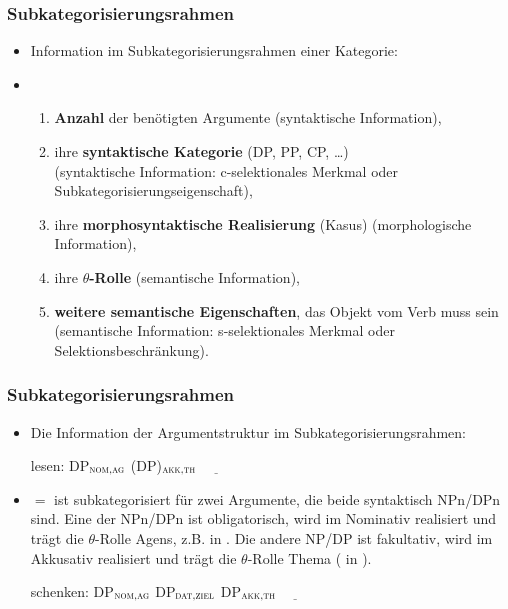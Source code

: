 \begin{frame}
\frametitle{Subkategorisierungsrahmen}

\begin{itemize}
	\item Information im Subkategorisierungsrahmen einer Kategorie:
	\item[]
	\begin{enumerate}
		\item \textbf{Anzahl} der benötigten Argumente (syntaktische Information),
\medskip		
		\item ihre \textbf{syntaktische Kategorie} (DP, PP, CP, \dots )\\
		(syntaktische Information: c-selektionales Merkmal oder Subkategorisierungseigenschaft),
\medskip		
		\item ihre \textbf{morphosyntaktische Realisierung} (\zB Kasus) (morphologische Information),
\medskip		
		\item ihre \textbf{$\theta$-Rolle} (semantische Information),
\medskip
		\item \textbf{weitere semantische Eigenschaften}, \zB das Objekt vom Verb  muss  sein (semantische Information: s-selektionales Merkmal oder 	Selektionsbeschränkung).
	\end{enumerate}
	
\end{itemize}

\end{frame}


\begin{frame}
\frametitle{Subkategorisierungsrahmen}

\begin{itemize}

	\item Die Information der Argumentstruktur im Subkategorisierungsrahmen:
	
	\ea lesen: DP$_{\textsc{nom,ag}}$ (DP)$_{\textsc{akk,th}}$ $\underline{\qquad}$
	\z
	
	\item[] \textbf{$=$}  ist subkategorisiert für zwei Argumente, die beide syntaktisch NPn/DPn sind. Eine der NPn/DPn ist obligatorisch, wird im Nominativ realisiert und trägt die $\theta$-Rolle Agens, z.B.  in . Die andere NP/DP ist fakultativ, wird im Akkusativ realisiert und trägt die $\theta$-Rolle Thema (\zB {} in ).

	\ea schenken: DP$_{\textsc{nom,ag}}$ DP$_{\textsc{dat,ziel}}$  DP$_{\textsc{akk,th}}$ $\underline{\qquad}$ 
	\z
		
\end{itemize}

\end{frame}


